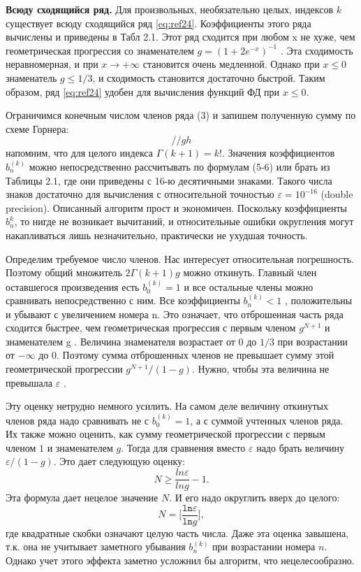\textbf{Всюду сходящийся ряд.} Для произвольных, необязательно целых,
индексов $k$ существует всюду сходящийся ряд \ref{eq:ref24}.
Коэффициенты этого ряда вычислены и приведены в Табл 2.1.
Этот ряд сходится при любом x не хуже, чем геометрическая прогрессия со
знаменателем $g = (1 + 2e^{-x})^{-1}$ . Эта сходимость неравномерная, и при $x \to +\infty$
становится очень медленной. Однако при $x \leqslant 0$ знаменатель $g \leqslant 1/3$, и
сходимость становится достаточно быстрой. Таким образом, ряд \ref{eq:ref24} удобен для
вычисления функций ФД при $x \leqslant 0$.

Ограничимся конечным числом членов ряда (3) и запишем
полученную сумму по схеме Горнера:
\begin{equation}
// gh
\end{equation}
напомним, что для целого индекса $\Gamma(k+1) = k!$. Значения коэффициентов $b_n^{(k)}$
можно непосредственно рассчитывать по формулам (5-6) или брать из Таблицы 2.1, где
они приведены с 16-ю десятичными знаками. Такого числа знаков достаточно
для вычисления с относительной точностью $\varepsilon = 10^{-16}$ (double precision).
Описанный алгоритм прост и экономичен. Поскольку коэффициенты $b_n^{k}$, то нигде не возникает вычитаний, и относительные ошибки округления могут накапливаться лишь незначительно, практически не ухудшая точность.

Определим требуемое число членов. Нас интересует относительная погрешность. Поэтому
общий множитель $2\Gamma(k + 1)g$ можно откинуть. Главный член оставшегося
произведения есть $b_0^{(k)}=1$ и все остальные члены можно сравнивать
непосредственно с ним. Все коэффициенты $b_n^{(k)}<1$ , положительны и убывают с
увеличением номера n. Это означает, что отброшенная часть ряда сходится
быстрее, чем геометрическая прогрессия с первым членом $g^{N+1}$ и знаменателем
g . Величина знаменателя возрастает от $0$ до $1/3$ при возрастании от $-\infty$ до 0.
Поэтому сумма отброшенных членов не превышает сумму этой геометрической
прогрессии $g^{N+1}/(1-g)$. Нужно, чтобы эта величина не превышала $\varepsilon$ .

Эту оценку нетрудно немного усилить. На самом деле величину откинутых
членов ряда надо сравнивать не с $b_0^{(k)}=1$, а с суммой учтенных членов ряда. Их
также можно оценить, как сумму геометрической прогрессии с первым членом
$1$ и знаменателем $g$. Тогда для сравнения вместо $\varepsilon$ надо брать величину
$\varepsilon/(1-g)$. Это дает следующую оценку:
\begin{equation}
N \geqslant \frac{ln \varepsilon}{ln g} - 1.
\end{equation}
Эта формула дает нецелое значение $N$. И его надо округлить вверх до целого:
\begin{equation}
N = \Bigg[\frac{\texttt{ln} \varepsilon}{\texttt{ln} g}\Bigg],
\end{equation}
где квадратные скобки означают целую часть числа. Даже эта оценка завышена,
т.к. она не учитывает заметного убывания $b_n^{(k)}$ при возрастании номера $n$.
Однако учет этого эффекта заметно усложнил бы алгоритм, что
нецелесообразно.

